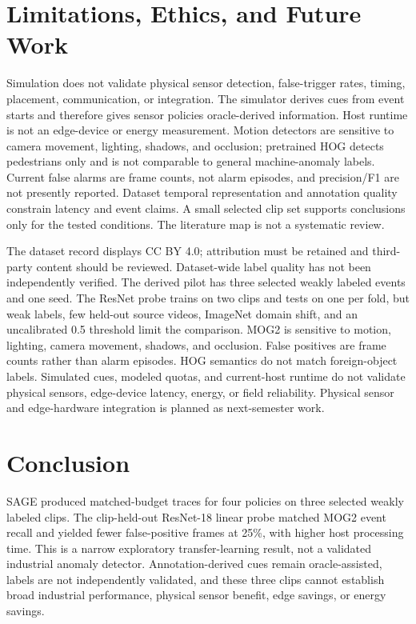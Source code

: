 \documentclass[conference]{IEEEtran}
\begin{document}
\section{Limitations, Ethics, and Future Work}
Simulation does not validate physical sensor detection, false-trigger rates, timing, placement, communication, or integration. The simulator derives cues from event starts and therefore gives sensor policies oracle-derived information. Host runtime is not an edge-device or energy measurement. Motion detectors are sensitive to camera movement, lighting, shadows, and occlusion; pretrained HOG detects pedestrians only and is not comparable to general machine-anomaly labels. Current false alarms are frame counts, not alarm episodes, and precision/F1 are not presently reported. Dataset temporal representation and annotation quality constrain latency and event claims. A small selected clip set supports conclusions only for the tested conditions. The literature map is not a systematic review.

The dataset record displays CC BY 4.0; attribution must be retained and third-party content should be reviewed. Dataset-wide label quality has not been independently verified. The derived pilot has three selected weakly labeled events and one seed. The ResNet probe trains on two clips and tests on one per fold, but weak labels, few held-out source videos, ImageNet domain shift, and an uncalibrated 0.5 threshold limit the comparison. MOG2 is sensitive to motion, lighting, camera movement, shadows, and occlusion. False positives are frame counts rather than alarm episodes. HOG semantics do not match foreign-object labels. Simulated cues, modeled quotas, and current-host runtime do not validate physical sensors, edge-device latency, energy, or field reliability. Physical sensor and edge-hardware integration is planned as next-semester work.

\section{Conclusion}
SAGE produced matched-budget traces for four policies on three selected weakly labeled clips. The clip-held-out ResNet-18 linear probe matched MOG2 event recall and yielded fewer false-positive frames at 25\%, with higher host processing time. This is a narrow exploratory transfer-learning result, not a validated industrial anomaly detector. Annotation-derived cues remain oracle-assisted, labels are not independently validated, and these three clips cannot establish broad industrial performance, physical sensor benefit, edge savings, or energy savings.



\end{document}
